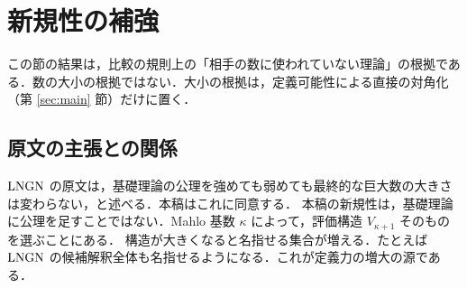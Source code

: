 \section{新規性の補強}\label{sec:novel}

この節の結果は，比較の規則上の「相手の数に使われていない理論」の根拠である．数の大小の根拠ではない．大小の根拠は，定義可能性による直接の対角化（第 \ref{sec:main} 節）だけに置く．

\subsection{原文の主張との関係}
$\mathrm{LNGN}$ の原文は，基礎理論の公理を強めても弱めても最終的な巨大数の大きさは変わらない，と述べる．本稿はこれに同意する．
本稿の新規性は，基礎理論に公理を足すことではない．Mahlo 基数 $\kappa$ によって，評価構造 $V_{\kappa+1}$ そのものを選ぶことにある．
構造が大きくなると名指せる集合が増える．たとえば $\mathrm{LNGN}$ の候補解釈全体も名指せるようになる．これが定義力の増大の源である．

